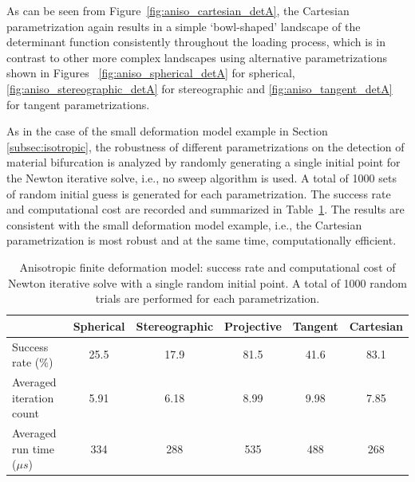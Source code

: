 \documentclass[12pt]{article}
\numberwithin{equation}{section}
\begin{document}
As can be seen from Figure~\ref{fig:aniso_cartesian_detA}, the 
Cartesian parametrization again results in a simple `bowl-shaped' 
landscape of the determinant function consistently throughout the 
loading process, which is in contrast to other more complex landscapes 
using alternative parametrizations shown in Figures~ 
\ref{fig:aniso_spherical_detA} for spherical, 
\ref{fig:aniso_stereographic_detA} for stereographic and 
\ref{fig:aniso_tangent_detA} for tangent parametrizations. 

As in the case of the small deformation model example in 
Section \ref{subsec:isotropic}, the robustness of different 
parametrizations on the detection of material bifurcation is analyzed 
by randomly generating a single initial point for the Newton iterative 
solve, i.e., no sweep algorithm is used. A total of 1000 sets of 
random initial guess is generated for each parametrization. The 
success rate and computational cost are recorded and summarized in 
Table~\ref{tab:aniso_axial_random_para}. The results are consistent 
with the small deformation model example, i.e., the Cartesian 
parametrization is most robust and at the same time, computationally efficient. 

\begin{table}[H]
  \begin{center}
    \begin{tabular}{l | c c c c c}
      \toprule
        &  Spherical    &   Stereographic   & Projective   &   Tangent   &   Cartesian                 \\
      \midrule
      Success rate ($\%$)                      &    25.5    &    17.9     &    81.5     &    41.6     &     83.1          \\ 
      Averaged iteration count               &    5.91    &    6.18    &    8.99     &    9.98    &    7.85         \\
      Averaged run time (${\mu}s$)     &    334     &    288     &    535      &    488      &    268         \\
      \bottomrule
    \end{tabular}
    \caption{Anisotropic finite deformation model: success rate and computational cost of Newton iterative solve with a single random initial point. A total of 1000 random trials are performed for each parametrization.}
    \label{tab:aniso_axial_random_para}
  \end{center}
\end{table}
\end{document}
